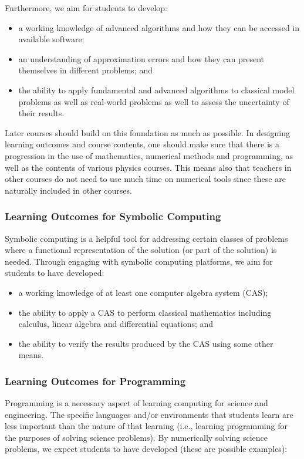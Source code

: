 \documentclass[graybox,envcountchap,sectrefs]{svmult}
\begin{document}
Furthermore, we aim for students to develop:

\begin{itemize}

\item a working knowledge of advanced algorithms and how they can be accessed in available software;

\item an understanding of approximation errors and how they can present themselves in different problems; and

\item the ability to apply fundamental and advanced algorithms to classical model problems as well as real-world problems as well to assess the uncertainty of their results.
\end{itemize}


Later courses should build on this foundation as much as possible. In designing learning outcomes and course contents, one should make
sure that there is a progression in the use of mathematics, numerical
methods and programming, as well as the contents of various physics
courses.  This means also that teachers in other courses do not need
to use much time on numerical tools since these are naturally included
in other courses.



\subsubsection{Learning Outcomes for Symbolic Computing}
Symbolic computing  is a helpful tool for addressing certain classes of
problems where a functional representation of the solution (or part of
the solution) is needed. Through engaging with symbolic computing
platforms, we aim for students to have developed:

\begin{itemize}
\item a working knowledge of at least one computer algebra system (CAS);

\item the ability to apply a CAS to perform classical mathematics including calculus, linear algebra and differential equations; and

\item the ability to verify the results produced by the CAS using some other means.
\end{itemize}


\subsubsection{Learning Outcomes for Programming}
Programming is a necessary aspect of learning computing  for science
and engineering. The specific languages and/or environments that
students learn are less important than the nature of that learning
(i.e., learning programming for the purposes of solving science
problems). By numerically solving science problems, we expect students
to have developed (these are possible examples):
\end{document}
